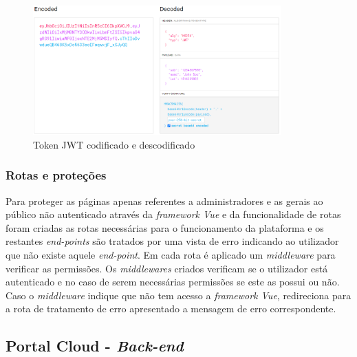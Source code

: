 \begin{figure}[ht]
\centering
\includegraphics[width=0.85\textwidth]{images/jwt.png}
\caption{Token JWT codificado e descodificado \cite{jwt}}\label{jwt1}
\end{figure}

\subsubsection{Rotas e proteções}

\par Para proteger as páginas apenas referentes a administradores e as gerais ao público não autenticado através da \textit{framework Vue} e da funcionalidade de rotas foram criadas as rotas necessárias para o funcionamento da plataforma e os restantes \textit{end-points} são tratados por uma vista de erro indicando ao utilizador que não existe aquele \textit{end-point}. Em cada rota é aplicado um \textit{middleware} para verificar as permissões. Os \textit{middlewares} criados verificam se o utilizador está autenticado e no caso de serem necessárias permissões se este as possui ou não. Caso o \textit{middleware} indique que não tem acesso a \textit{framework Vue}, redireciona para a rota de tratamento de erro apresentado a mensagem de erro correspondente.

\subsection{Portal Cloud - \textit{Back-end}}

